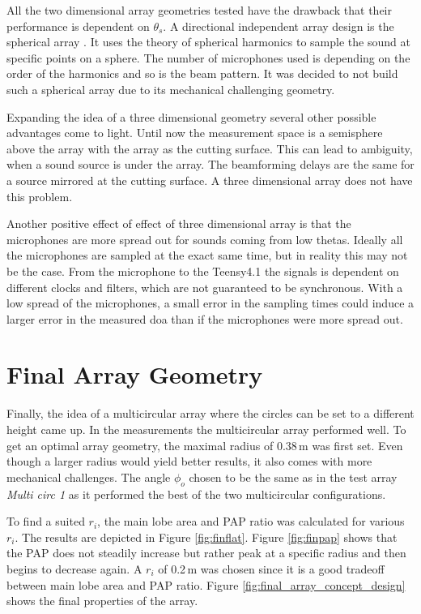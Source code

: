 All the two dimensional array geometries tested have the drawback
that their performance is dependent on $\theta_s$.
A directional independent array design is the spherical array \cite{Rafaely2010}.
It uses the theory of spherical harmonics to sample the sound at specific points
on a sphere.
The number of microphones used is depending on the order of the harmonics and so
is the beam pattern.
It was decided to not build such a spherical array due to its mechanical
challenging geometry.

Expanding the idea of a three dimensional geometry several other
possible advantages come to light.
Until now the measurement space is a semisphere above the array with the array as the cutting surface.
This can lead to ambiguity, when a sound source is under the array.
The beamforming delays are the same for a source mirrored at the cutting surface.
A three dimensional array does not have this problem.

Another positive effect of effect of three dimensional array is
that the microphones are more spread out for sounds
coming from low thetas.
Ideally all the microphones are sampled at the exact same time, but in
reality this may not be the case.
From the microphone to the Teensy4.1 the signals is dependent on different clocks and
filters, which are not guaranteed to be synchronous.
With a low spread of the microphones, a small error in the sampling times could
induce a larger error in the measured \acrshort{doa} than if
the microphones were more spread out.


\newpage
\section{Final Array Geometry} \label{sec:final_array_geometry}
Finally, the idea of a multicircular array where the circles can be
set to a different height came up.
In the measurements the multicircular array performed well.
To get an optimal array geometry, the maximal radius of 0.38\,m was first set.
Even though a larger radius would yield better results, it also
comes with more mechanical challenges.
The angle $\phi_o$ chosen to be the same as in the test array
\textit{Multi circ 1} as it performed the best of the two multicircular
configurations.

To find a suited $r_i$, the main lobe area and PAP ratio was calculated for
various $r_i$.
The results are depicted in Figure \ref{fig:finflat}.
Figure \ref{fig:finpap} shows that the PAP does not
steadily increase but rather peak at a specific radius and then
begins to decrease again.
A $r_i$ of 0.2\,m was chosen since it is a good tradeoff between
main lobe area and PAP ratio.
Figure \ref{fig:final_array_concept_design} shows the final
properties of the array.

